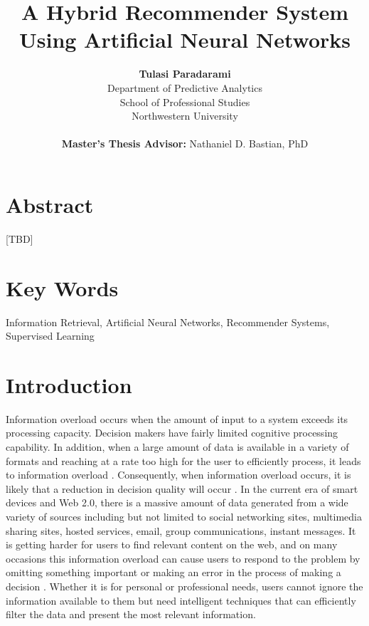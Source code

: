 \documentclass[12pt]{article}
\title{\textbf{A Hybrid Recommender System \\Using Artificial Neural Networks}}
\author{\textbf{Tulasi Paradarami}\\Department of Predictive Analytics\\School of Professional Studies\\Northwestern University\\\\\textbf{Master's Thesis Advisor:} Nathaniel D. Bastian, PhD}
\date{}
\begin{document}
\maketitle
\normalsize

\section*{Abstract}

[TBD]

\section*{Key Words}

Information Retrieval, Artificial Neural Networks, Recommender Systems, Supervised Learning

\newpage\section{Introduction}

Information overload occurs when the amount of input to a system exceeds its processing capacity. Decision makers have fairly limited cognitive processing capability. In addition, when a large amount of data is available in a variety of formats and reaching at a rate too high for the user to efficiently process, it leads to information overload \cite{edmunds}. Consequently, when information overload occurs, it is likely that a reduction in decision quality will occur \cite{speier,milord,miller g. a. 1956.txt,simon h. a. 1979.txt}. In the current era of smart devices and Web 2.0, there is a massive amount of data generated from a wide variety of sources including but not limited to social networking sites, multimedia sharing sites, hosted services, email, group communications, instant messages. It is getting harder for users to find relevant content on the web, and on many occasions this information overload can cause users to respond to the problem by omitting something important or making an error in the process of making a decision \cite{vickery}. Whether it is for personal or professional needs, users cannot ignore the information available to them but need intelligent techniques that can efficiently filter the data and present the most relevant information.
\end{document}
